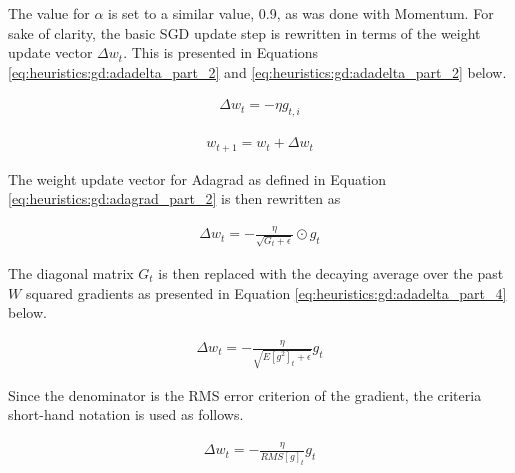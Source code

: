 The value for $\alpha$ is set to a similar value, 0.9, as was done with \ac{Momentum}. For sake of clarity, the basic \ac{SGD} update step is rewritten in terms of the weight update vector $\Delta w_{t}$. This is presented in Equations \ref{eq:heuristics:gd:adadelta_part_2} and \ref{eq:heuristics:gd:adadelta_part_2} below.

\begin{equation}
      \label{eq:heuristics:gd:adadelta_part_2}
      \begin{split}
            \Delta w_{t} = -\eta g_{t,i}
      \end{split}
\end{equation}

\begin{equation}
      \label{eq:heuristics:gd:adadelta_part_3}
      \begin{split}
            w_{t+1} = w_{t} + \Delta w_{t}
      \end{split}
\end{equation}

The weight update vector for \ac{Adagrad} as defined in Equation \ref{eq:heuristics:gd:adagrad_part_2} is then rewritten as


\begin{equation}
      \label{eq:heuristics:gd:adagrad_part_2_new}
      \begin{split}
            \Delta w_{t} = - \frac{\eta}{\sqrt{G_{t} + \epsilon}} \odot g_{t}
      \end{split}
\end{equation}

The diagonal matrix $G_{t}$ is then replaced with the decaying average over the past $W$ squared gradients as presented in Equation \ref{eq:heuristics:gd:adadelta_part_4} below.

\begin{equation}
      \label{eq:heuristics:gd:adadelta_part_4}
      \begin{split}
            \Delta w_{t} = - \frac{\eta}{\sqrt{E[g^{2}]_{t} + \epsilon}} g_{t}
      \end{split}
\end{equation}

Since the denominator is the \ac{RMS} error criterion of the gradient, the criteria short-hand notation is used as follows.

\begin{equation}
      \label{eq:heuristics:gd:adadelta_part_5}
      \begin{split}
            \Delta w_{t} = - \frac{\eta}{RMS[g]_{t}} g_{t}
      \end{split}
\end{equation}

